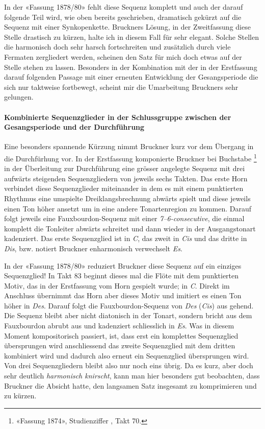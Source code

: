 In der «Fassung 1878/80» fehlt diese Sequenz komplett und auch der darauf folgende Teil wird, wie oben bereits geschrieben, dramatisch gekürzt auf die Sequenz mit einer Synkopenkette.
Bruckners Lösung, in der Zweitfassung diese Stelle drastisch zu kürzen, halte ich in diesem Fall für sehr elegant.
Solche Stellen die harmonisch doch sehr harsch fortschreiten und zusätzlich durch viele Fermaten zergliedert werden, scheinen den Satz für mich doch etwas auf der Stelle stehen zu lassen.
Besonders in der Kombination mit der in der Erstfassung darauf folgenden Passage mit einer erneuten Entwicklung der Gesangsperiode die sich nur taktweise fortbewegt, scheint mir die Umarbeitung Bruckners sehr gelungen.

\paragraph{Kombinierte Sequenzglieder in der Schlussgruppe zwischen der Gesangsperiode und der Durchführung}

Eine besonders spannende Kürzung nimmt Bruckner kurz vor dem Übergang in die Durchfürhung vor.
In der Erstfassung komponierte Bruckner bei Buchstabe \footnote{«Fassung 1874», Studienziffer , Takt 70.} in der Überleitung zur Durchführung eine grösser angelegte Sequenz mit drei aufwärts steigenden Sequenzgliedern von jeweils sechs Takten.
Das erste Horn verbindet diese Sequenzglieder miteinander in dem es mit einem punktierten Rhythmus eine umspielte Dreiklangsbrechnung abwärts spielt und diese jeweils einen Ton höher ansetzt um in eine andere Tonartenregion zu kommen.
Darauf folgt jeweils eine Fauxbourdon-Sequenz mit einer \emph{7--6-consecutive}, die einmal komplett die Tonleiter abwärts schreitet und dann wieder in der Ausgangstonart kadenziert.
Das erste Sequenzglied ist in \emph{C}, das zweit in \emph{Cis} und das dritte in \emph{Dis}, bzw. notiert Bruckner enharmonisch verwechselt \emph{Es}.

In der «Fassung 1878/80» reduziert Bruckner diese Sequenz auf ein einziges Sequenzglied! In Takt 83 beginnt dieses mal die Flöte mit dem punktierten Motiv, das in der Erstfassung vom Horn gespielt wurde; in \emph{C}.
Direkt im Anschluss übernimmt das Horn aber dieses Motiv und imitiert es einen Ton höher in \emph{Des}.
Darauf folgt die Fauxbourdon-Sequenz von \emph{Des} (\emph{Cis}) aus gehend.
Die Sequenz bleibt aber nicht diatonisch in der Tonart, sondern bricht aus dem Fauxbourdon abrubt aus und kadenziert schliesslich in \emph{Es}.
Was in diesem Moment kompositorisch passiert, ist, dass erst ein komplettes Sequenzglied übersprungen wird anschliessend das zweite Sequenzglied mit dem dritten kombiniert wird und dadurch also erneut ein Sequenzglied übersprungen wird.
Von drei Sequenzgliedern bleibt also nur noch eins übrig.
Da es kurz, aber doch sehr deutlich \emph{harmonisch knirscht}, kann man hier besonders gut beobachten, dass Bruckner die Absicht hatte, den langsamen Satz insgesamt zu komprimieren und zu kürzen.


